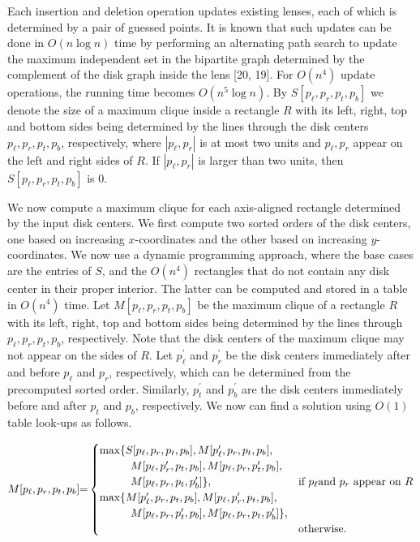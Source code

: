 Each insertion and deletion operation updates existing lenses, each of which is determined by a pair of guessed points. It is known that such updates can be done in $O(n\log n)$ time by performing an alternating path search to update the maximum independent set in the bipartite graph determined by the complement of the disk graph inside the lens [20, 19]. For $O(n^{4})$ update operations, the running time becomes $O(n^{5}\log n)$. By $S[p_{\ell},p_{r},p_{t},p_{b}]$ we denote the size of a maximum clique inside a rectangle $R$ with its left, right, top and bottom sides being determined by the lines through the disk centers $p_{\ell},p_{r},p_{t},p_{b}$, respectively, where $|p_{\ell},p_{r}|$ is at most two units and $p_{\ell},p_{r}$ appear on the left and right sides of $R$. If $|p_{\ell},p_{r}|$ is larger than two units, then $S[p_{\ell},p_{r},p_{t},p_{b}]$ is 0.
\par
\par
We now compute a maximum clique for each axis-aligned rectangle determined by the input disk centers. We first compute two sorted orders of the disk centers, one based on increasing $x$-coordinates and the other based on increasing $y$-coordinates. We now use a dynamic programming approach, where the base cases are the entries of $S$, and the $O(n^{4})$ rectangles that do not contain any disk center in their proper interior. The latter can be computed and stored in a table in $O(n^{4})$ time. Let $M[p_{\ell},p_{r},p_{t},p_{b}]$ be the maximum clique of a rectangle $R$ with its left, right, top and bottom sides being determined by the lines through $p_{\ell},p_{r},p_{t},p_{b}$, respectively. Note that the disk centers of the maximum clique may not appear on the sides of $R$. Let $p^{\prime}_{\ell}$ and $p^{\prime}_{r}$ be the disk centers immediately after and before $p_{\ell}$ and $p_{r}$, respectively, which can be determined from the precomputed sorted order. Similarly, $p^{\prime}_{t}$ and $p^{\prime}_{b}$ are the disk centers immediately before and after $p_{t}$ and $p_{b}$, respectively. We now can find a solution using $O(1)$ table look-ups as follows.
\par
\[\begin{aligned}
\displaystyle M[p_{\ell},p_{r},p_{t},p_{b}]{=}\begin{cases}\max\{S[p_{\ell},p_%
{r},p_{t},p_{b}],M[p^{\prime}_{\ell},p_{r},p_{t},p_{b}],\\
\hskip 28.45274ptM[p_{\ell},p^{\prime}_{r},p_{t},p_{b}],M[p_{\ell},p_{r},p^{%
\prime}_{t},p_{b}],\\
\hskip 28.45274ptM[p_{\ell},p_{r},p_{t},p^{\prime}_{b}]\},&\text{if $p_{\ell}$%
 and $p_{r}$ appear on $R$}\\
\max\{M[p^{\prime}_{\ell},p_{r},p_{t},p_{b}],M[p_{\ell},p^{\prime}_{r},p_{t},p%
_{b}],\\
\hskip 28.45274ptM[p_{\ell},p_{r},p^{\prime}_{t},p_{b}],M[p_{\ell},p_{r},p_{t}%
,p^{\prime}_{b}]\},\\
&\text{otherwise.}\\
\end{cases}
\end{aligned}\]
